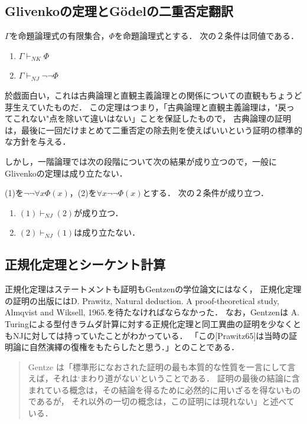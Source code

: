 \documentclass[uplatex, dvipdfmx]{jsreport}
\begin{document}
\subsection{Glivenkoの定理とGödelの二重否定翻訳}

\begin{theorem}
    $\Gamma$を命題論理式の有限集合，$\Phi$を命題論理式とする．
    次の２条件は同値である．
    \begin{enumerate}
        \item $\Gamma\vdash_{NK}\Phi$
        \item $\Gamma\vdash_{NJ}\lnot\lnot\Phi$
    \end{enumerate}
\end{theorem}
\begin{remark}
    於戯面白い，これは古典論理と直観主義論理との関係についての直観もちょうど芽生えていたものだ．
    この定理はつまり，「古典論理と直観主義論理は，"戻ってこれない"点を除いて違いはない」ことを保証したもので，
    古典論理の証明は，最後に一回だけまとめて二重否定の除去則を使えばいいという証明の標準的な方針を与える．
\end{remark}

しかし，一階論理では次の段階について次の結果が成り立つので，一般にGlivenkoの定理は成り立たない．
\begin{proposition}[クリプキモデル]
    (1)を$\lnot\lnot\forall x\Phi(x)$，(2)を$\forall x\lnot\lnot\Phi(x)$とする．
    次の２条件が成り立つ．
    \begin{enumerate}
        \item $(1)\vdash_{NJ} (2)$が成り立つ．
        \item $(2)\vdash_{NJ} (1)$は成り立たない．
    \end{enumerate}
\end{proposition}

\subsection{正規化定理とシーケント計算}
正規化定理はステートメントも証明もGentzenの学位論文にはなく，
正規化定理の証明の出版にはD. Prawitz, Natural deduction. A proof-theoretical study, Almqvist and Wiksell, 1965.を待たなければならなかった．
なお，Gentzenは A. Turingによる型付きラムダ計算に対する正規化定理と同工異曲の証明を少なくともNJに対しては持っていたことがわかっている．
「この[Prawitz65]は当時の証明論に自然演繹の復権をもたらしたと思う．」とのことである\cite{新井敏康-Gentzen}．
\begin{quote}
    Gentze は「標準形になおされた証明の最も本質的な性質を一言にして言えば，それは‘まわり道がない’ということである．
    証明の最後の結論に含まれている概念は，その結論を得るために必然的に用いざるを得ないものであるが，
    それ以外の一切の概念は，この証明には現れない」と述べている．\cite{新井敏康-Gentzen}
\end{quote}
\end{document}
